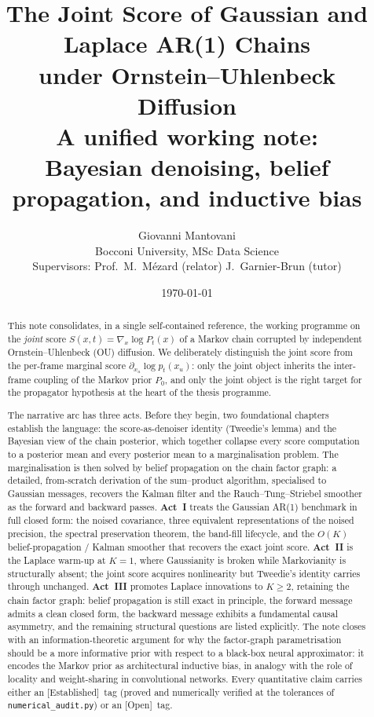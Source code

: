 \documentclass[11pt]{article}
\title{The Joint Score of Gaussian and Laplace AR(1) Chains \\
       under Ornstein--Uhlenbeck Diffusion \\[6pt]
       \large A unified working note: \\
       Bayesian denoising, belief propagation, and inductive bias}
\author{Giovanni Mantovani \\
        Bocconi University, MSc Data Science \\[2pt]
        \small Supervisors: Prof.\ M.\ M\'ezard (relator) \quad J.\ Garnier-Brun (tutor)}
\date{\today}
\theoremstyle{definition}
\newcommand{\Established}{\textcolor{black!50!green}{\textsf{[Established]}}}
\newcommand{\OpenTag}{\textcolor{black!60!red}{\textsf{[Open]}}}
\begin{document}
\maketitle

\begin{abstract}
This note consolidates, in a single self-contained reference, the
working programme on the \emph{joint} score
\(S(x, t) = \nabla_x \log P_t(x)\) of a Markov chain corrupted by
independent Ornstein--Uhlenbeck (OU) diffusion. We deliberately
distinguish the joint score from the per-frame marginal score
\(\partial_{x_u} \log p_t(x_u)\): only the joint object inherits the
inter-frame coupling of the Markov prior \(P_0\), and only the joint
object is the right target for the propagator hypothesis at the heart
of the thesis programme.

The narrative arc has three acts. Before they begin, two foundational
chapters establish the language: the score-as-denoiser identity
(Tweedie's lemma) and the Bayesian view of the chain posterior, which
together collapse every score computation to a posterior mean and
every posterior mean to a marginalisation problem. The marginalisation
is then solved by belief propagation on the chain factor graph: a
detailed, from-scratch derivation of the sum--product algorithm,
specialised to Gaussian messages, recovers the Kalman filter and the
Rauch--Tung--Striebel smoother as the forward and backward passes.
\textbf{Act~I} treats the Gaussian AR(1) benchmark in full closed
form: the noised covariance, three equivalent representations of the
noised precision, the spectral preservation theorem, the band-fill
lifecycle, and the \(O(K)\) belief-propagation / Kalman smoother
that recovers the exact joint score. \textbf{Act~II} is the Laplace
warm-up at \(K = 1\), where Gaussianity is broken while Markovianity
is structurally absent; the joint score acquires nonlinearity but
Tweedie's identity carries through unchanged. \textbf{Act~III}
promotes Laplace innovations to \(K \geq 2\), retaining the chain
factor graph: belief propagation is still exact in principle, the
forward message admits a clean closed form, the backward message
exhibits a fundamental causal asymmetry, and the remaining structural
questions are listed explicitly. The note closes with an
information-theoretic argument for why the factor-graph
parametrisation should be a more informative prior with respect to a black-box neural approximator: it encodes the Markov prior as architectural inductive
bias, in analogy with the role of locality and weight-sharing
in convolutional networks. Every quantitative claim carries either an
\Established\ tag (proved and numerically verified at the tolerances
of \texttt{numerical\_audit.py}) or an \OpenTag\ tag.
\end{abstract}
\end{document}
